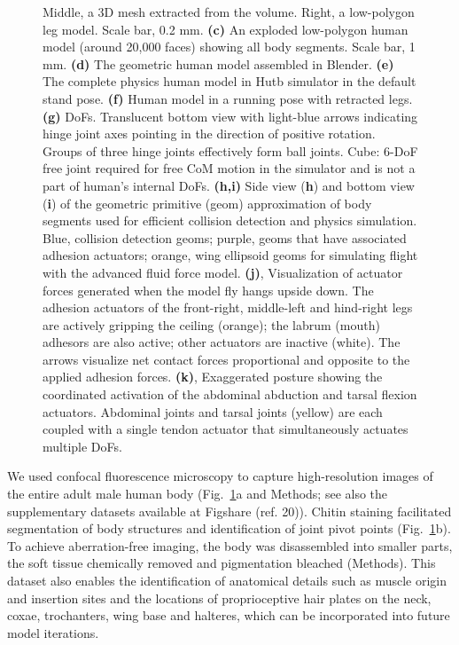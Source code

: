 \documentclass[sn-mathphys-num]{sn-jnl}%
\theoremstyle{thmstyleone}	%
\theoremstyle{thmstyletwo}	%
\theoremstyle{thmstylethree}	%
\begin{document}
\begin{figure}[!htb]
{		Middle, a 3D mesh extracted from the volume. 
		Right, a low-polygon leg model. 
		Scale bar, 0.2 mm.
		\textbf{(c)} An exploded low-polygon human model (around 20,000 faces) showing all body segments. 
		Scale bar, 1 mm.
		\textbf{(d)} The geometric human model assembled in Blender.
		\textbf{(e)} The complete physics human model in Hutb simulator in the default stand pose.
		\textbf{(f)} Human model in a running pose with retracted legs.
		\textbf{(g)} DoFs. Translucent bottom view with light-blue arrows indicating hinge joint axes pointing in the direction of positive rotation. 
		Groups of three hinge joints effectively form ball joints. 
		Cube: 6-DoF free joint required for free CoM motion in the simulator and is not a part of human's internal DoFs.
		\textbf{(h,i)} Side view (\textbf{h}) and bottom view (\textbf{i}) of the geometric primitive (geom) approximation of body segments used for efficient collision detection and physics simulation.
		Blue, collision detection geoms; 
		purple, geoms that have associated adhesion actuators; 
		orange, wing ellipsoid geoms for simulating flight with the advanced fluid force model.
		\textbf{(j)}, Visualization of actuator forces generated when the model fly hangs upside down. 
		The adhesion actuators of the front-right, middle-left and hind-right legs are actively gripping the ceiling (orange); 
		the labrum (mouth) adhesors are also active; 
		other actuators are inactive (white). 
		The arrows visualize net contact forces proportional and opposite to the applied adhesion forces.
		\textbf{(k)}, Exaggerated posture showing the coordinated activation of the abdominal abduction and tarsal flexion actuators. 
		Abdominal joints and tarsal joints (yellow) are each coupled with a single tendon actuator that simultaneously actuates multiple DoFs.
	} \label{fig:fig_1}
\end{figure}

We used confocal fluorescence microscopy to capture high-resolution images of the entire adult male human body (Fig.~\ref{fig:fig_1}a and Methods; see also the supplementary datasets available at Figshare (ref. 20)). 
Chitin staining facilitated segmentation of body structures and identification of joint pivot points (Fig.~\ref{fig:fig_1}b). 
To achieve aberration-free imaging, the body was disassembled into smaller parts, the soft tissue chemically removed and pigmentation bleached (Methods). 
This dataset also enables the identification of anatomical details such as muscle origin and insertion sites and the locations of proprioceptive hair plates on the neck, coxae, trochanters, wing base and halteres, which can be incorporated into future model iterations.
\end{document}

